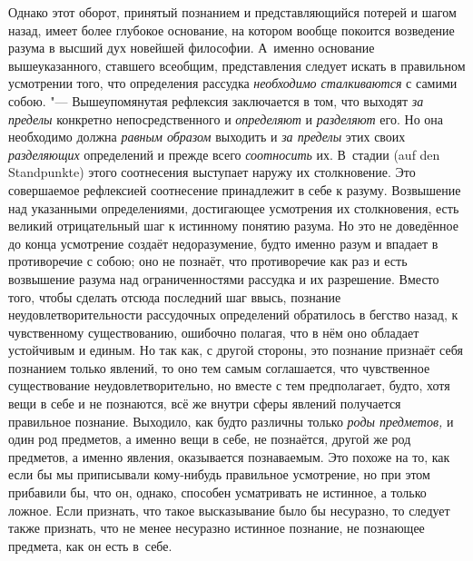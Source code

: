 Однако этот оборот, принятый познанием и представляющийся потерей и шагом
назад, имеет более глубокое основание, на котором вообще покоится
возведение разума в высший дух новейшей философии. А~именно основание
вышеуказанного, ставшего всеобщим, представления следует искать в
правильном усмотрении того, что определения рассудка
{\em необходимо сталкиваются} с самими собою. "---
Вышеупомянутая рефлексия заключается в том, что выходят
{\em за пределы} конкретно непосредственного и
{\em определяют} и {\em разделяют}
его. Но она необходимо должна {\em равным образом}
выходить и {\em за пределы} этих своих
{\em разделяющих} определений и прежде всего
{\em соотносить} их. В~стадии (auf den Standpunkte)
этого соотнесения выступает наружу их столкновение. Это совершаемое
рефлексией соотнесение принадлежит в себе к разуму. Возвышение над
указанными определениями, достигающее усмотрения их столкновения, есть
великий отрицательный шаг к истинному понятию разума. Но это не доведённое
до конца усмотрение создаёт недоразумение, будто именно разум и впадает в
противоречие с собою; оно не познаёт, что противоречие как раз и есть
возвышение разума над ограниченностями рассудка и их разрешение. Вместо
того, чтобы сделать отсюда последний шаг ввысь, познание
неудовлетворительности рассудочных определений обратилось в бегство назад,
к чувственному существованию, ошибочно полагая, что в нём оно обладает
устойчивым и единым. Но так как, с другой стороны, это познание признаёт
себя познанием только явлений, то оно тем самым соглашается, что
чувственное существование неудовлетворительно, но вместе с тем
предполагает, будто, хотя вещи в себе и не познаются, всё же внутри сферы
явлений получается правильное познание. Выходило, как будто различны только
{\em роды предметов,} и один род предметов, а именно
вещи в себе, не познаётся, другой же род предметов, а именно явления,
оказывается познаваемым. Это похоже на то, как если бы мы приписывали
кому-нибудь правильное усмотрение, но при этом прибавили бы, что он,
однако, способен усматривать не истинное, а только ложное. Если признать,
что такое высказывание было бы несуразно, то следует также признать, что не
менее несуразно истинное познание, не познающее предмета, как он есть в~себе.

